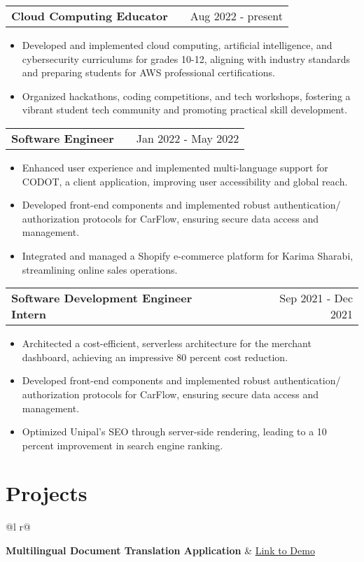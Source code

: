 \documentclass[a4paper,12pt]{article}
\makeatletter
\newenvironment{joblong}[2]
    {
    \begin{tabularx}{\linewidth}{@{}l X r@{}}
    \textbf{#1} & \hfill &  #2 \\[3.75pt]
    \end{tabularx}
    \begin{minipage}[t]{\linewidth}
    \begin{itemize}[nosep,after=\strut, leftmargin=1em, itemsep=3pt,label=--]
    }
    {
    \end{itemize}
    \end{minipage}    
    }
\makeatother
\begin{document}
\begin{joblong}{Cloud Computing Educator}{Aug 2022 - present}
\item Developed and implemented cloud computing, artificial intelligence, and cybersecurity curriculums for grades 10-12, aligning with industry standards and preparing students for AWS professional certifications.
\item Organized hackathons, coding competitions, and tech workshops, fostering a vibrant student tech community and promoting practical skill development.
\end{joblong}

\begin{joblong}{Software Engineer}{Jan 2022 - May 2022}
    \item Enhanced user experience and implemented multi-language support for CODOT, a client application, improving user accessibility and global reach.
    \item Developed front-end components and implemented robust authentication/ authorization protocols for CarFlow, ensuring secure data access and management.
    \item Integrated and managed a Shopify e-commerce platform for Karima Sharabi, streamlining online sales operations.
\end{joblong}

\begin{joblong}{Software Development Engineer Intern}{Sep 2021 - Dec 2021}
    \item Architected a cost-efficient, serverless architecture for the merchant dashboard, achieving an impressive 80 percent cost reduction.
    \item Developed front-end components and implemented robust authentication/ authorization protocols for CarFlow, ensuring secure data access and management.
    \item Optimized Unipal's SEO through server-side rendering, leading to a 10 percent improvement in search engine ranking.
\end{joblong}
  
\section{Projects}

\begin{tabularx}{\linewidth}{ @{}l r@{} }

\textbf{Multilingual Document Translation Application} & \hfill \href{https://some-link.com}{Link to Demo} \\[3.75pt]
  \\

\end{tabularx}
\end{document}
